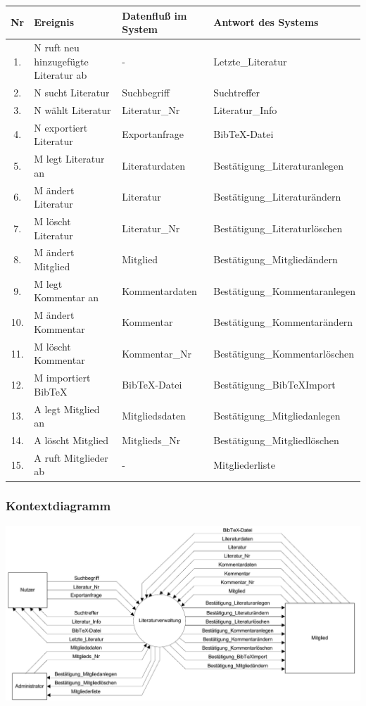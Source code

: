 \begin{longtable}{|c|p{9.0em}|p{10.5em}|l|}
\hline
Nr & Ereignis & Datenfluß im System & Antwort des Systems \\
\hline\hline
\endhead

1. & N ruft neu hinzugefügte Literatur ab & - & Letzte\_Literatur \\\hline
2. & N sucht Literatur & Suchbegriff & Suchtreffer \\\hline
3. & N wählt Literatur & Literatur\_Nr & Literatur\_Info \\\hline
4. & N exportiert Literatur & Exportanfrage &  BibTeX-Datei \\\hline
5. & M legt Literatur an & Literaturdaten & Bestätigung\_Literaturanlegen \\\hline
6. & M ändert Literatur & Literatur & Bestätigung\_Literaturändern\\\hline
7. & M löscht Literatur & Literatur\_Nr & Bestätigung\_Literaturlöschen \\\hline
8. & M ändert Mitglied & Mitglied & Bestätigung\_Mitgliedändern \\\hline
9. & M legt Kommentar an & Kommentardaten & Bestätigung\_Kommentaranlegen \\\hline
10. & M ändert Kommentar & Kommentar & Bestätigung\_Kommentarändern \\\hline
11. & M löscht Kommentar & Kommentar\_Nr & Bestätigung\_Kommentarlöschen \\\hline
12.& M importiert BibTeX & BibTeX-Datei & Bestätigung\_BibTeXImport \\\hline
13.& A legt Mitglied an & Mitgliedsdaten & Bestätigung\_Mitgliedanlegen \\\hline
14.& A löscht Mitglied & Mitglieds\_Nr & Bestätigung\_Mitgliedlöschen \\\hline
15.& A ruft Mitglieder ab & - & Mitgliederliste \\\hline
\end{longtable}

\newpage %
\subsubsection{Kontextdiagramm}

\includegraphics[scale=0.75]{kontextdiagramm}

